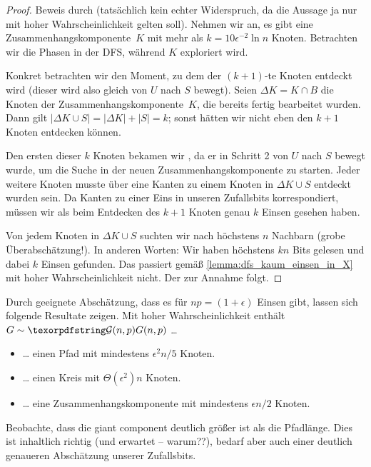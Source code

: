 \begin{proof}
    Beweis durch  (tatsächlich kein echter Widerspruch, da die Aussage ja nur mit hoher Wahrscheinlichkeit gelten soll).
    Nehmen wir an, es gibt eine Zusammenhangskomponente~$K$ mit mehr als $k = 10 \epsilon^{-2} \ln n$ Knoten.
    Betrachten wir die Phasen in der DFS, während $K$ exploriert wird.

    Konkret betrachten wir den Moment, zu dem der $(k+1)$-te Knoten entdeckt wird (dieser wird also gleich von $U$ nach $S$ bewegt).
    Seien $\Delta K = K \cap B$ die Knoten der Zusammenhangskomponente~$K$, die bereits fertig bearbeitet wurden.
    Dann gilt $|\Delta K \cup S| = |\Delta K| + |S| = k$; sonst hätten wir nicht eben den $k+1$ Knoten entdecken können.

    Den ersten dieser $k$ Knoten bekamen wir , da er in Schritt 2 von $U$ nach $S$ bewegt wurde, um die Suche in der neuen Zusammenhangskomponente zu starten.
    Jeder weitere Knoten musste über eine Kanten zu einem Knoten in $\Delta K \cup S$ entdeckt wurden sein.
    Da Kanten zu einer Eins in unseren Zufallsbits korrespondiert, müssen wir als beim Entdecken des $k+1$ Knoten genau $k$ Einsen gesehen haben.

    Von jedem Knoten in $\Delta K \cup S$ suchten wir nach höchstens $n$ Nachbarn (grobe Überabschätzung!).
    In anderen Worten: Wir haben höchstens $k n$ Bits gelesen und dabei $k$ Einsen gefunden.
    Das passiert gemäß \cref{lemma:dfs_kaum_einsen_in_X} mit hoher Wahrscheinlichkeit nicht.
    Der  zur Annahme folgt.
\end{proof}

Durch geeignete Abschätzung, dass es für $np = (1 + \epsilon)$  Einsen gibt, lassen sich folgende Resultate zeigen.
Mit hoher Wahrscheinlichkeit enthält $G \sim \Gnp$ \ldots
\begin{itemize}
    \item \ldots{} einen Pfad mit mindestens $\epsilon^2 n / 5$ Knoten.
    \item \ldots{} einen Kreis mit $\Theta(\epsilon^2) n$ Knoten.
    \item \ldots{} eine Zusammenhangskomponente mit mindestens $\epsilon n / 2$ Knoten.
\end{itemize}

Beobachte, dass die giant component deutlich größer ist als die Pfadlänge.
Dies ist inhaltlich richtig (und erwartet -- warum??), bedarf aber auch einer deutlich genaueren Abschätzung unserer Zufallsbits.

